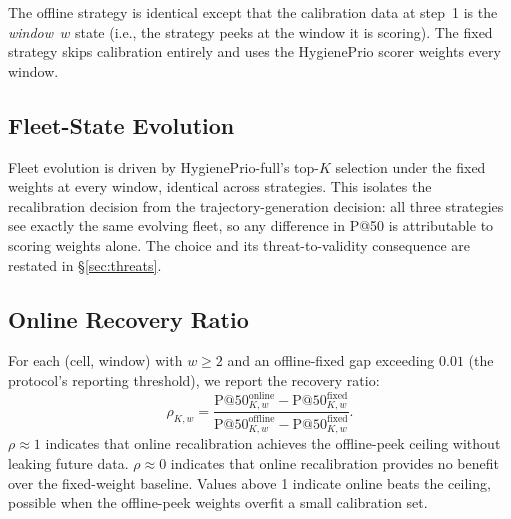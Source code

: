 The \textsf{offline} strategy is identical except that the calibration
data at step~1 is the \textit{window~$w$} state (i.e., the strategy
peeks at the window it is scoring). The \textsf{fixed} strategy skips
calibration entirely and uses the HygienePrio scorer weights every window.

\subsection{Fleet-State Evolution}

Fleet evolution is driven by HygienePrio-full's top-$K$ selection under
the \textsf{fixed} weights at every window, identical across strategies.
This isolates the recalibration decision from the trajectory-generation
decision: all three strategies see exactly the same evolving fleet, so
any difference in P@50 is attributable to scoring weights alone. The
choice and its threat-to-validity consequence are restated in
\S\ref{sec:threats}.

\subsection{Online Recovery Ratio}

For each (cell, window) with $w \geq 2$ and an offline-fixed gap
exceeding $0.01$ (the protocol's reporting threshold), we report the
recovery ratio:
\begin{equation}
\rho_{K, w} = \frac{\text{P@50}^{\mathrm{online}}_{K, w} - \text{P@50}^{\mathrm{fixed}}_{K, w}}
 {\text{P@50}^{\mathrm{offline}}_{K, w} - \text{P@50}^{\mathrm{fixed}}_{K, w}}.
\end{equation}
$\rho \approx 1$ indicates that online recalibration achieves the
offline-peek ceiling without leaking future data. $\rho \approx 0$
indicates that online recalibration provides no benefit over the
fixed-weight baseline. Values above 1 indicate online beats the
ceiling, possible when the offline-peek weights overfit a small
calibration set.
